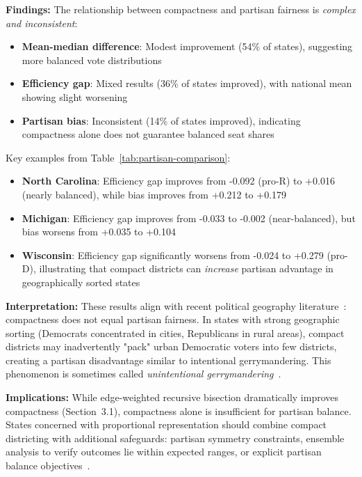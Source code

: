\textbf{Findings:} The relationship between compactness and partisan fairness is \textit{complex and inconsistent}:
\begin{itemize}
    \item \textbf{Mean-median difference}: Modest improvement (54\% of states), suggesting more balanced vote distributions
    \item \textbf{Efficiency gap}: Mixed results (36\% of states improved), with national mean showing slight worsening
    \item \textbf{Partisan bias}: Inconsistent (14\% of states improved), indicating compactness alone does not guarantee balanced seat shares
\end{itemize}

Key examples from Table~\ref{tab:partisan-comparison}:
\begin{itemize}
    \item \textbf{North Carolina}: Efficiency gap improves from -0.092 (pro-R) to +0.016 (nearly balanced), while bias improves from +0.212 to +0.179
    \item \textbf{Michigan}: Efficiency gap improves from -0.033 to -0.002 (near-balanced), but bias worsens from +0.035 to +0.104
    \item \textbf{Wisconsin}: Efficiency gap significantly worsens from -0.024 to +0.279 (pro-D), illustrating that compact districts can \textit{increase} partisan advantage in geographically sorted states
\end{itemize}

\textbf{Interpretation:} These results align with recent political geography literature~\cite{chen2017unintentional, rodden2019partisan}: compactness does not equal partisan fairness. In states with strong geographic sorting (Democrats concentrated in cities, Republicans in rural areas), compact districts may inadvertently "pack" urban Democratic voters into few districts, creating a partisan disadvantage similar to intentional gerrymandering. This phenomenon is sometimes called \textit{unintentional gerrymandering}~\cite{rodden2010efficiency}.

\textbf{Implications:} While edge-weighted recursive bisection dramatically improves compactness (Section~3.1), compactness alone is insufficient for partisan balance. States concerned with proportional representation should combine compact districting with additional safeguards: partisan symmetry constraints, ensemble analysis to verify outcomes lie within expected ranges, or explicit partisan balance objectives~\cite{duchin2018geometry}.

